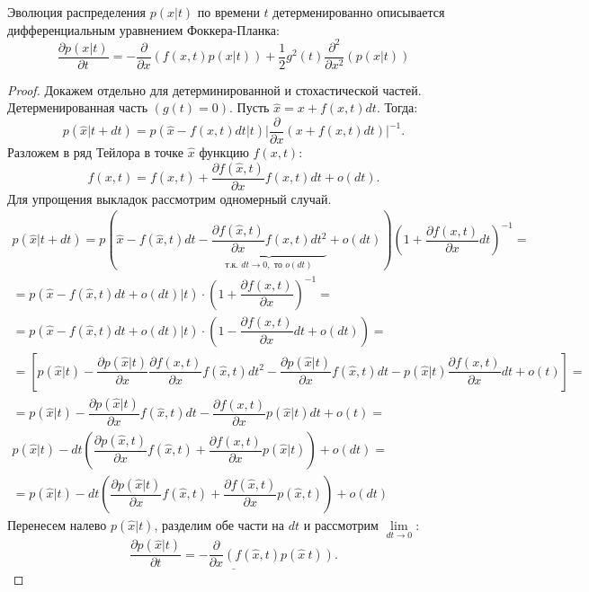 \begin{theorem}
    Эволюция распределения $p(x|t)$ по времени $t$ детерменированно описывается дифференциальным уравнением Фоккера-Планка:
    \[
        \dfrac{\partial p(x|t)}{\partial t} = -\dfrac{\partial }{\partial x} \left(f\left(x,t\right)p(x|t) \right) + \dfrac{1}{2}g^2 (t) \dfrac{\partial^2}{\partial x^2} \left(p(x|t)\right)
    \]
\end{theorem}
\begin{proof}
    Докажем отдельно для детерминированной и стохастической частей. Детерменированная часть $(g(t) = 0)$. Пусть $\hat{x} = x + f(x,t)dt$. Тогда:
    \[
        p(\hat{x} | t + dt) = p(\hat{x} - f(x,t)dt | t) \bigg|\dfrac{\partial }{\partial x} (x + f(x, t)dt)\bigg|^{-1}.
    \]
    Разложем в ряд Тейлора в точке $\hat{x}$ функцию $f(x,t)$:
    \[
        f(x, t) = f(\hat{x}, t) + \dfrac{\partial f(\hat{x}, t)}{\partial x} f(x,t)dt + o(dt).
    \]
    Для упрощения выкладок рассмотрим одномерный случай. 
    \[
        \begin{array}{c}
            p(\hat{x} | t + dt) = p\left(\hat{x} - f(\hat{x}, t) dt - \underbrace{\dfrac{\partial f(\hat{x}, t)}{\partial x} f(x, t) dt^2}_{\text{т.к. } dt \to 0, \text{ то } o(dt)} + o(dt)\right)\left(1 + \dfrac{\partial f(x, t)}{\partial x} dt\right)^{-1} = \\[0.5cm]
            = p(\hat{x} - f(\hat{x}, t)dt + o(dt)| t) \cdot \left(1 + \dfrac{\partial f(x, t)}{\partial x}\right)^{-1} = \\[0.5cm]
            = p(\hat{x} - f(\hat{x}, t) dt + o(dt) | t) \cdot \left(1 - \dfrac{\partial f(x, t)}{\partial x} dt + o(dt)\right) = \\ [0.5cm]
            = \left[p(\hat{x} | t) - \dfrac{\partial p(\hat{x} | t)}{\partial x} \dfrac{\partial f(x,t)}{\partial x} f(\hat{x}, t)dt^2 - \dfrac{\partial p(\hat{x} | t)}{\partial x} f(\hat{x}, t)dt - p(\hat{x} | t) \dfrac{\partial f(x,t)}{\partial x} dt + o(t)\right] = \\[0.5cm]
            = p(\hat{x} | t) - \dfrac{\partial p(\hat{x} | t)}{\partial x} f(\hat{x}, t) dt - \dfrac{\partial f(x,t)}{\partial x} p(\hat{x} | t) dt + o(t) = \\
            p(\hat{x}  | t) - dt \left(\dfrac{\partial p(\hat{x}, t)}{\partial x} f(\hat{x} , t) + \dfrac{\partial f(x,t)}{\partial x} p(\hat{x} | t)\right) + o(dt) = \\
            = p(\hat{x} | t) - dt\left(\dfrac{\partial p(\hat{x} | t)}{\partial x} f(\hat{x}, t) + \dfrac{\partial f(\hat{x}, t)}{\partial x} p(\hat{x}, t)\right) + o(dt)
        \end{array}
    \]
    Перенесем налево $p(\hat{x} | t)$, разделим обе части на $dt$ и рассмотрим $\lim\limits_{dt\to 0}$:
    \[
        \underline{\dfrac{\partial p(\hat{x} | t)}{\partial t} = -\dfrac{\partial }{\partial x} \left(f(\hat{x}, t) p(\hat{x} \ t)\right). }
    \]


\end{proof}
